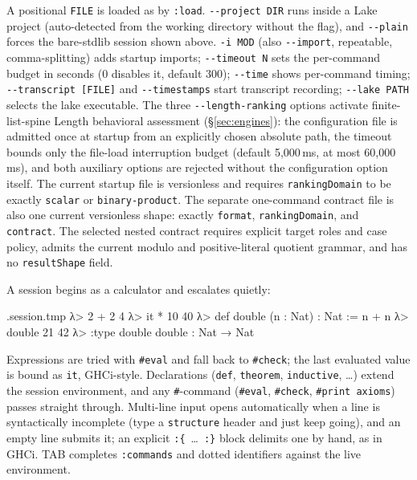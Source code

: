 \documentclass[11pt,oneside]{article}
\newcommand{\code}[1]{\texttt{#1}}
\newenvironment{session}
 {\VerbatimEnvironment\begin{VerbatimOut}{\jobname.session.tmp}}
 {\end{VerbatimOut}%
  \begin{sessionouter}%
  \VerbatimInput[fontsize=\footnotesize, breaklines=true,
    breaksymbolleft={\textcolor{stone}{\footnotesize$\hookrightarrow$}},
    formatcom=\color{ink}, tabsize=4]{\jobname.session.tmp}%
  \end{sessionouter}}
\begin{document}
A positional \code{FILE} is loaded as by \code{:load}.
\code{-{}-project DIR} runs inside a Lake project (auto-detected from the
working directory without the flag), and \code{-{}-plain} forces the
bare-stdlib session shown above.  \code{-i MOD} (also
\code{-{}-import}, repeatable, comma-splitting) adds startup imports;
\code{-{}-timeout N} sets the per-command budget in seconds (0 disables
it, default 300); \code{-{}-time} shows per-command timing;
\code{-{}-transcript [FILE]} and \code{-{}-timestamps} start transcript
recording; \code{-{}-lake PATH} selects the lake executable.  The three
\code{-{}-length-ranking} options activate finite-list-spine Length
behavioral assessment (\S\ref{sec:engines}): the configuration file is
admitted once at startup from an explicitly chosen absolute path, the
timeout bounds only the file-load interruption budget (default
5{,}000\,ms, at most 60{,}000\,ms), and both auxiliary options are
rejected without the configuration option itself. The current startup file is
versionless and requires \code{rankingDomain} to be exactly \code{scalar} or
\code{binary-product}. The separate one-command contract file is also one
current versionless shape: exactly \code{format}, \code{rankingDomain}, and
\code{contract}. The selected nested contract requires explicit target roles
and case policy, admits the current modulo and positive-literal quotient
grammar, and has no \code{resultShape} field.

A session begins as a calculator and escalates quietly:

\begin{session}
λ> 2 + 2
4
λ> it * 10
40
λ> def double (n : Nat) : Nat := n + n
λ> double 21
42
λ> :type double
double : Nat → Nat
\end{session}

Expressions are tried with \code{\#eval} and fall back to
\code{\#check}; the last evaluated value is bound as \code{it},
GHCi-style. Declarations (\code{def}, \code{theorem},
\code{inductive}, \dots) extend the session environment, and any
\code{\#}-command (\code{\#eval}, \code{\#check}, \code{\#print
axioms}) passes straight through. Multi-line input opens automatically
when a line is syntactically incomplete (type a \code{structure}
header and just keep going), and an empty line submits it; an explicit
\code{:\{}~\dots~\code{:\}} block delimits one by hand, as in GHCi.
TAB completes \code{:commands} and dotted identifiers against the live
environment.

\end{document}
